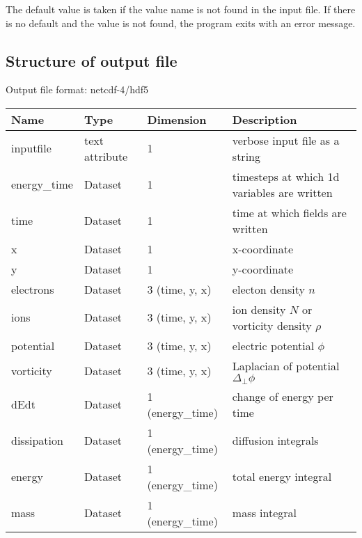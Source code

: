 The default value is taken if the value name is not found in the input file. If there is no default and
the value is not found,
the program exits with an error message.

\subsection{Structure of output file}
Output file format: netcdf-4/hdf5
%
\begin{longtable}{lll>{\RaggedRight}p{7cm}}
\toprule
\rowcolor{gray!50}\textbf{Name} &  \textbf{Type} & \textbf{Dimension} & \textbf{Description}  \\ \midrule
inputfile  &             text attribute & 1 & verbose input file as a string \\
energy\_time             & Dataset & 1 & timesteps at which 1d variables are written \\
time                     & Dataset & 1 & time at which fields are written \\
x                        & Dataset & 1 & x-coordinate  \\
y                        & Dataset & 1 & y-coordinate \\
electrons                & Dataset & 3 (time, y, x) & electon density $n$ \\
ions                     & Dataset & 3 (time, y, x) & ion density $N$ or vorticity density $\rho$  \\
potential                & Dataset & 3 (time, y, x) & electric potential $\phi$  \\
vorticity                & Dataset & 3 (time, y, x) & Laplacian of potential $\Delta_{\perp}\phi$  \\
dEdt                     & Dataset & 1 (energy\_time) & change of energy per time  \\
dissipation              & Dataset & 1 (energy\_time) & diffusion integrals  \\
energy                   & Dataset & 1 (energy\_time) & total energy integral  \\
mass                     & Dataset & 1 (energy\_time) & mass integral   \\
\bottomrule
\end{longtable}




